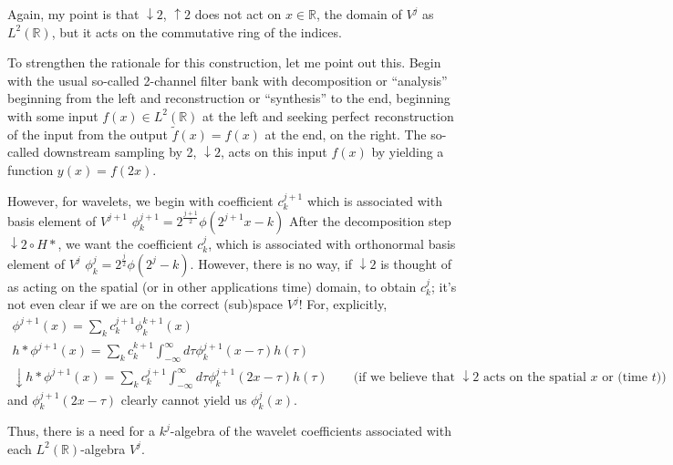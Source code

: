 \documentclass[twoside]{amsart}
\theoremstyle{plain}
\theoremstyle{definition}
\theoremstyle{remark}
\numberwithin{equation}{section}
\begin{document}
Again, my point is that $\downarrow 2$, $\uparrow 2$ does not act on $x\in \mathbb{R}$, the domain of $V^j$ as $L^2(\mathbb{R})$, but it acts on the commutative ring of the indices.  

To strengthen the rationale for this construction, let me point out this.  Begin with the usual so-called 2-channel filter bank with decomposition or ``analysis'' beginning from the left and reconstruction or ``synthesis'' to the end, beginning with some input $f(x) \in L^2(\mathbb{R})$ at the left and seeking perfect reconstruction of the input from the output $\widetilde{f}(x) = f(x)$ at the end, on the right.  The so-called downstream sampling by 2, $\downarrow 2$, acts on this input $f(x)$ by yielding a function $y(x) = f(2x)$.  

However, for wavelets, we begin with coefficient $c_k^{j+1}$ which is associated with basis element of $V^{j+1}$ $\phi^{j+1}_k = 2^{\frac{j+1}{2}} \phi( 2^{j+1}x -k)$ After the decomposition step $\downarrow 2 \circ H*$, we want the coefficient $c_k^j$, which is associated with orthonormal basis element of $V^j$ $\phi^j_k = 2^{ \frac{j}{2}} \phi(2^j -k)$.  However, there is no way, if $\downarrow 2$ is thought of as acting on the spatial (or in other applications time) domain, to obtain $c^j_k$; it's not even clear if we are on the correct (sub)space $V^j$!  For, explicitly,
\[
\begin{gathered}
  \phi^{j+1}(x) = \sum_k c^{j+1}_k\phi_k^{k+1}(x) \\ 
  h * \phi^{j+1}(x) = \sum_k c_k^{k+1} \int_{-\infty}^{\infty} d\tau \phi^{j+1}_k(x-\tau)h(\tau) \\ 
  \downarrow h* \phi^{j+1}(x) = \sum_k c_k^{j+1} \int_{-\infty}^{\infty} d\tau \phi^{j+1}_k(2x-\tau)h(\tau) \quad \quad \text{(if we believe that $\downarrow 2$ acts on the spatial $x$ or (time $t$))}
\end{gathered}
\]
and $\phi^{j+1}_k(2x-\tau)$ clearly cannot yield us $\phi^j_k(x)$.  

Thus, there is a need for a $k^j$-algebra of the wavelet coefficients associated with each $L^2(\mathbb{R})$-algebra $V^j$.  
\end{document}
